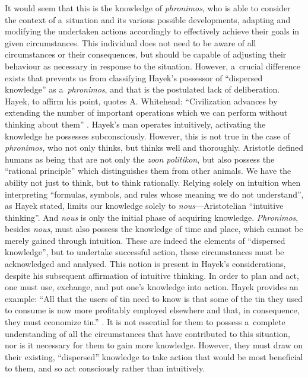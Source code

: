 It would seem that this is the knowledge of \textit{phronimos}, who is able to consider the context of a~situation and its various possible developments, adapting and modifying the undertaken actions accordingly to effectively achieve their goals in given circumstances. This individual does not need to be aware of all circumstances or their consequences, but should be capable of adjusting their behaviour as necessary in response to the situation. However, a~crucial difference exists that prevents us from classifying Hayek's possessor of ``dispersed knowledge'' as a~\textit{phronimos}, and that is the postulated lack of deliberation. Hayek, to affirm his point, quotes A. Whitehead: ``Civilization advances by extending the number of important operations which we can perform without thinking about them'' 
\parencite[][p.528]{hayek_use_1945}. %
 Hayek's man operates intuitively, activating the knowledge he possesses subconsciously. However, this is not true in the case of \textit{phronimos,} who not only thinks, but thinks well and thoroughly. Aristotle defined humans as being that are not only the \textit{zoon politikon}, but also possess the ``rational principle'' 
\parencite[][]{rackham_nicomachean_1934} %
 which distinguishes them from other animals. We have the ability not just to think, but to think rationally. Relying solely on intuition when interpreting ``formulas, symbols, and rules whose meaning we do not understand'', as Hayek 
\parencite*[][p.528]{hayek_use_1945} %
 stated, limits our knowledge solely to \textit{nous}---Aristotelian ``intuitive thinking''. And \textit{nous} is only the initial phase of acquiring knowledge. \textit{Phronimos}, besides \textit{nous}, must also possess the knowledge of time and place, which cannot be merely gained through intuition. These are indeed the elements of ``dispersed knowledge'', but to undertake successful action, these circumstances must be acknowledged and analysed. This notion is present in Hayek's considerations, despite his subsequent affirmation of intuitive thinking. In order to plan and act, one must use, exchange, and put one's knowledge into action. Hayek provides an example: ``All that the users of tin need to know is that some of the tin they used to consume is now more profitably employed elsewhere and that, in consequence, they must economize tin.'' 
\parencite[][p.526]{hayek_use_1945}. %
 It is not essential for them to possess a~complete understanding of all the circumstances that have contributed to this situation, nor is it necessary for them to gain more knowledge. However, they must draw on their existing, ``dispersed'' knowledge to take action that would be most beneficial to them, and so act consciously rather than intuitively.



